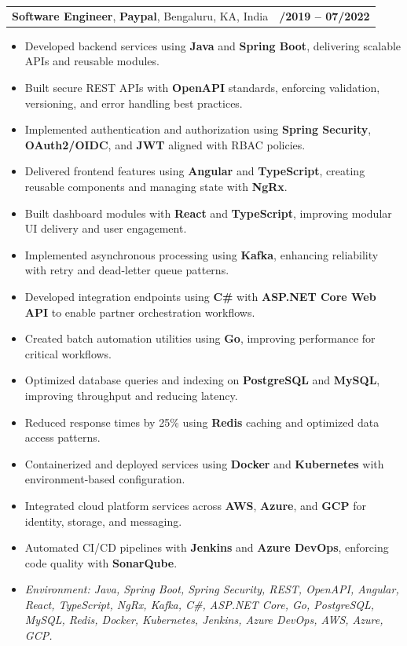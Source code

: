 \documentclass[letterpaper,11pt]{article}
\makeatletter
\newcommand{\resumeItem}[1]{
  \item\footnotesize{
    {#1 \vspace{-2pt}}
  }
}
\newcommand{\resumeSubheading}[4]{
  \vspace{-2pt}\item
    \begin{tabular*}{1.0\textwidth}[t]{l@{\extracolsep{\fill}}r}
      \textbf{\fontsize{10pt}{14pt}\selectfont #3}, \textbf{\fontsize{10pt}{14pt}\selectfont #1}, \fontsize{10pt}{14pt}\selectfont #4 & \textbf{\fontsize{10pt}{14pt}\selectfont #2} \\
    \end{tabular*}\vspace{-7pt}
}
\newcommand{\resumeItemListStart}{\begin{itemize}[leftmargin=*]}
\newcommand{\resumeItemListEnd}{\end{itemize}\vspace{-5pt}}
\makeatother
\begin{document}
\resumeSubheading
{Paypal}{08/2019 -- 07/2022}
{Software Engineer}{Bengaluru, KA, India}
\resumeItemListStart
  \resumeItem{Developed backend services using \textbf{Java} and \textbf{Spring Boot}, delivering scalable APIs and reusable modules.}
  \resumeItem{Built secure REST APIs with \textbf{OpenAPI} standards, enforcing validation, versioning, and error handling best practices.}
  \resumeItem{Implemented authentication and authorization using \textbf{Spring Security}, \textbf{OAuth2/OIDC}, and \textbf{JWT} aligned with RBAC policies.}
  \resumeItem{Delivered frontend features using \textbf{Angular} and \textbf{TypeScript}, creating reusable components and managing state with \textbf{NgRx}.}
  \resumeItem{Built dashboard modules with \textbf{React} and \textbf{TypeScript}, improving modular UI delivery and user engagement.}
  \resumeItem{Implemented asynchronous processing using \textbf{Kafka}, enhancing reliability with retry and dead-letter queue patterns.}
  \resumeItem{Developed integration endpoints using \textbf{C\#} with \textbf{ASP.NET Core Web API} to enable partner orchestration workflows.}
  \resumeItem{Created batch automation utilities using \textbf{Go}, improving performance for critical workflows.}
  \resumeItem{Optimized database queries and indexing on \textbf{PostgreSQL} and \textbf{MySQL}, improving throughput and reducing latency.}
  \resumeItem{Reduced response times by 25\% using \textbf{Redis} caching and optimized data access patterns.}
  \resumeItem{Containerized and deployed services using \textbf{Docker} and \textbf{Kubernetes} with environment-based configuration.}
  \resumeItem{Integrated cloud platform services across \textbf{AWS}, \textbf{Azure}, and \textbf{GCP} for identity, storage, and messaging.}
  \resumeItem{Automated CI/CD pipelines with \textbf{Jenkins} and \textbf{Azure DevOps}, enforcing code quality with \textbf{SonarQube}.}
  \resumeItem{\textit{Environment: Java, Spring Boot, Spring Security, REST, OpenAPI, Angular, React, TypeScript, NgRx, Kafka, C\#, ASP.NET Core, Go, PostgreSQL, MySQL, Redis, Docker, Kubernetes, Jenkins, Azure DevOps, AWS, Azure, GCP.}}
\resumeItemListEnd
\end{document}
